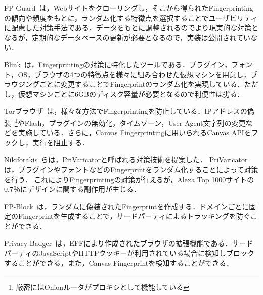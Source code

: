 FP Guard~\cite{faizkhademi2015fpguard}は，Webサイトをクローリングし，そこから得られたFingerprintingの傾向や頻度をもとに，ランダム化する特徴点を選択することでユーザビリティに配慮した対策手法である．データをもとに調整されるのでより現実的な対策となるが，定期的なデータベースの更新が必要となるので，実装は公開されていない．

Blink~\cite{blink}は，Fingerprintingの対策に特化したツールである．プラグイン，フォント，OS，ブラウザの4つの特徴点を様々に組み合わせた仮想マシンを用意し，ブラウジングごとに変更することでFingerprintのランダム化を実現している．ただし，仮想マシンごとに6GBのディスク容量が必要となるので利便性は劣る．

Torブラウザ~\cite{tor}は，様々な方法でFingerprintingを防止している．IPアドレスの偽装~\footnote{厳密にはOnionルータがプロキシとして機能している}やFlash，プラグインの無効化，タイムゾーン，User-Agent文字列の変更などを実施している．さらに，Canvas Fingerprintingに用いられるCanvas APIをフックし，実行を阻止する．

Nikiforakis~\cite{nikiforakis2015privaricator}らは，PriVaricatorと呼ばれる対策技術を提案した．
PriVaricatorは，プラグインやフォントなどのFingerprintをランダム化することによって対策を行う．
これによりFingerprintingの対策が行えるが，Alexa Top 1000サイトの0.7％にデザインに関する副作用が生じる．

FP-Block~\cite{torres2015fp}は，ランダムに偽装されたFingerprintを作成する．ドメインごとに固定のFingerprintを生成することで，サードパーティによるトラッキングを防ぐことができる．

Privacy Badger~\cite{privacybadger}は，EFFにより作成されたブラウザの拡張機能である．サードパーティのJavaScriptやHTTPクッキーが利用されている場合に検知しブロックすることができる，また，Canvas Fingerprintを検知することができる．
